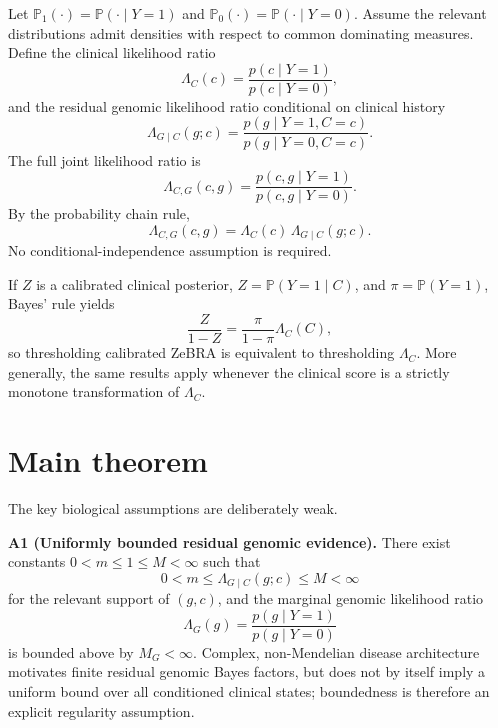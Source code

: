 \documentclass[journal]{IEEEtran}
\newcommand{\Pone}{\mathbb{P}_1}
\newcommand{\Pzero}{\mathbb{P}_0}
\newcommand{\LR}{\Lambda}
\begin{document}
Let $\Pone(\cdot)=\mathbb{P}(\cdot\mid Y=1)$ and $\Pzero(\cdot)=\mathbb{P}(\cdot\mid Y=0)$. Assume the relevant distributions admit densities with respect to common dominating measures. Define the clinical likelihood ratio
\begin{equation}
\LR_C(c)=\frac{p(c\mid Y=1)}{p(c\mid Y=0)},
\label{eq:clinicalLR}
\end{equation}
and the residual genomic likelihood ratio conditional on clinical history
\begin{equation}
\LR_{G\mid C}(g;c)
=\frac{p(g\mid Y=1,C=c)}{p(g\mid Y=0,C=c)}.
\label{eq:conditionalGLR}
\end{equation}
The full joint likelihood ratio is
\begin{equation}
\LR_{C,G}(c,g)
=\frac{p(c,g\mid Y=1)}{p(c,g\mid Y=0)}.
\end{equation}
By the probability chain rule,
\begin{equation}
\boxed{
\LR_{C,G}(c,g)
=\LR_C(c)\,\LR_{G\mid C}(g;c).
}
\label{eq:factorization}
\end{equation}
No conditional-independence assumption is required.

If $Z$ is a calibrated clinical posterior, $Z=\mathbb{P}(Y=1\mid C)$, and $\pi=\mathbb{P}(Y=1)$, Bayes' rule yields
\begin{equation}
\frac{Z}{1-Z}
=\frac{\pi}{1-\pi}\LR_C(C),
\label{eq:zlr}
\end{equation}
so thresholding calibrated ZeBRA is equivalent to thresholding $\LR_C$. More generally, the same results apply whenever the clinical score is a strictly monotone transformation of $\LR_C$.

\section{Main theorem}

The key biological assumptions are deliberately weak.

\textbf{A1 (Uniformly bounded residual genomic evidence).} There exist constants $0<m\le 1\le M<\infty$ such that
\begin{equation}
0<m\le \LR_{G\mid C}(g;c)\le M<\infty
\label{eq:boundedconditional}
\end{equation}
for the relevant support of $(g,c)$, and the marginal genomic likelihood ratio
\begin{equation}
\LR_G(g)=\frac{p(g\mid Y=1)}{p(g\mid Y=0)}
\end{equation}
is bounded above by $M_G<\infty$. Complex, non-Mendelian disease architecture motivates finite residual genomic Bayes factors, but does not by itself imply a uniform bound over all conditioned clinical states; boundedness is therefore an explicit regularity assumption.
\end{document}
